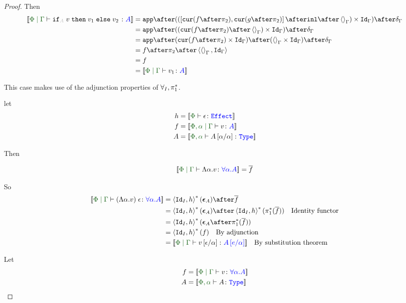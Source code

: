 \documentclass{Report}
\begin{document}
\begin{proof}
Then
\begin{equation}
    \begin{split}
        \deno{\gpetyperelation{\pifthenelse{A}{v}{v_1}{v_2}}{A}} & = \ifMorph{\inl\after\term{\G}}{f}{g} \\
        & = \app\after((\cur{f\after\pp}\after\term{\G})\times\idg)\after\diag{\G}\\
        & = \app\after(\cur{f\after\pp}\times\idg)\after(\term{\G}\times\idg)\after\diag{\G}\\
        & = f\after\pp\after\pr{\term{\G}}{\idg}\\
        & = f \\
        & = \deno{\gpetyperelation{v_1}{A}}\\
    \end{split}
\end{equation}

This case makes use of the adjunction properties of $\forall_I, \pi_1^*$.

let 
\begin{align*}
    h & = \deno{\typerelation{\P}{\e}{\effect}}
    \\
    f & = \deno{\etyperelation{\P,\a}{\G}{v}{A}}
    \\
    A &= \deno{\typerelation{\P,\a}{A\ssub{\a}{\a}}{\type}}
\end{align*}

Then

\begin{equation}
    \deno{\gpetyperelation{\elam{\a}{v}}{\all{\a}{A}}} = \bar{f}\\
\end{equation}

So
\begin{align*}
    \deno{\gpetyperelation{\eapp{(\elam{\a}{v})}{\e}}{\all{\a}{A}}} & = \pr{\Id{I}}{h}\star(\counit{A})\after\bar{f}\\
    & = \pr{\Id{I}}{h}\star(\counit{A})\after\pr{\Id{I}}{h}\star(\pstar(\bar{f}))\qt{Identity functor}\\
    &= \pr{\Id{I}}{h}\star(\counit{A}\after\pstar(\bar{f}))\\
    &= \pr{\Id{I}}{h}\star(f)\qt{By adjunction}\\
    &= \deno{\gpetyperelation{v\ssub{\a}{\e}}{A\ssub{\a}{e}}}\qt{By substitution theorem}\\
\end{align*}

    Let \begin{align*}
        f & = \deno{\gpetyperelation{v}{\all{\a}{A}}}\\
        A & = \deno{\typerelation{\P,\a}{A}{\type}}
    \end{align*}


\end{proof}
\end{document}
